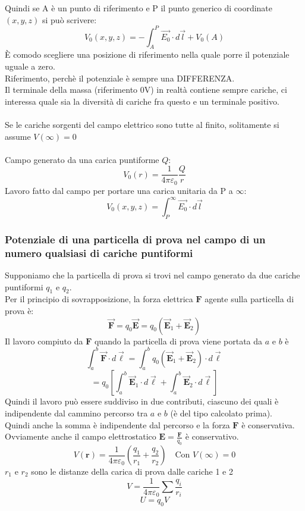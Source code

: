\documentclass[../main.tex]{subfiles}
\begin{document}
	Quindi se A è un punto di riferimento e P il punto generico di coordinate $(x,y,z)$ si può scrivere:
	$$ V_{0}(x, y, z) = - \int_{A}^{P} \vec{E_{0}} \cdot d\vec{l} + V_{0}(A) $$
	È comodo scegliere una posizione di riferimento nella quale porre il potenziale uguale a zero.\\
	Riferimento, perchè il potenziale è sempre una DIFFERENZA. \\
	Il terminale della massa (riferimento 0V) in realtà contiene sempre cariche, ci interessa quale sia la diversità di cariche fra questo e un terminale positivo.\\\\
	Se le cariche sorgenti del campo elettrico sono tutte al finito, solitamente si assume $V(\infty) = 0$\\\\
	Campo generato da una carica puntiforme $Q$:
	$$ V_{0}(r) = \frac{1}{4\pi \varepsilon_{0}} \frac{Q}{r} $$
	Lavoro fatto dal campo per portare una carica unitaria da P a $\infty$:
	$$ V_{0}(x, y, z) = \int_{P}^{\infty} \vec{E_{0}} \cdot d\vec{l} $$
	\subsubsection{Potenziale di una particella di prova nel campo di un numero qualsiasi di cariche puntiformi}
	Supponiamo che la particella di prova si trovi nel campo generato da due cariche puntiformi $q_1$ e $q_2$. \\
	Per il principio di sovrapposizione, la forza elettrica $\mathbf{F}$ agente sulla particella di prova è:
	$$ \vec{\mathbf{F}} = q_0 \vec{\mathbf{E}} = q_0 (\vec{\mathbf{E}}_1 + \vec{\mathbf{E}}_2) $$
	Il lavoro compiuto da $\mathbf{F}$ quando la particella di prova viene portata da $a$ e $b$ è
	$$ \int_a^b \vec{\mathbf{F}} \cdot d\vec{\ell} = \int_a^b q_0 \left(\vec{\mathbf{E}}_1 + \vec{\mathbf{E}}_2\right) \cdot d\vec{\ell} $$
	$$ = q_0 \left[ \int_a^b \vec{\mathbf{E}}_1 \cdot d\vec{\ell} + \int_a^b \vec{\mathbf{E}}_2 \cdot d\vec{\ell} \right]  $$
	Quindi il lavoro può essere suddiviso in due contributi, ciascuno dei quali è indipendente dal cammino percorso tra $a$ e $b$ (è del tipo calcolato prima). \\
	Quindi anche la somma è indipendente dal percorso e la forza $\mathbf{F}$ è conservativa. \\
	Ovviamente anche il campo elettrostatico $\mathbf{E} = \frac{\mathbf{F}}{q_0}$ è conservativo.
	$$ V(\mathbf{r}) = \frac{1}{4\pi\varepsilon_0} \left( \frac{q_1}{r_1} + \frac{q_2}{r_2} \right) \quad \text{Con } V(\infty) = 0 $$
	$r_1$ e $r_2$ sono le distanze della carica di prova dalle cariche 1 e 2
	$$ V = \frac {1}{4 \pi \varepsilon_ {0}} \sum \frac {q _ {i}}{r _ {i}} $$
	$$ U = q _ {0} V $$
\end{document}
